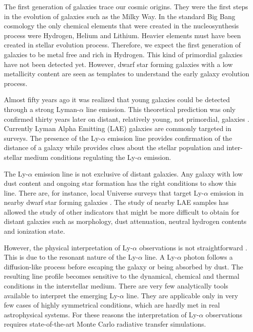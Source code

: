 \documentclass[a4paper, usenatbib, 12pt]{article}
\begin{document}
{The first generation of galaxies trace our cosmic origins. 
They were the first steps in the evolution of galaxies such as the Milky
Way. 
In the standard Big Bang cosmology the only chemical elements that
were created in the nucleosynthesis process were Hydrogen, Helium and
Lithium.  
Heavier elements must have been created in stellar evolution process. 
Therefore, we expect the first generation of
galaxies to be metal free and rich in Hydrogen. 
This kind of primordial galaxies have not been detected yet. 
However, dwarf star forming galaxies with a low metallicity content
are seen as templates to understand the early galaxy evolution process. 

Almost fifty years ago \cite{PartridgePeebles} it was realized that
young galaxies could be detected through a strong Lyman-$\alpha$ line
emission.  
This theoretical prediction was only confirmed thirty years later on
distant, relatively young, not primordial, galaxies \cite{1998ApJ...498L..93D}.
Currently Lyman Alpha Emitting (LAE) galaxies are commonly targeted
in surveys. 
The presence of the Ly-$\alpha$ emission line provides confirmation of
the distance of a galaxy while provides clues about the stellar
population and inter-stellar medium conditions regulating the
Ly-$\alpha$ emission. 

The Ly-$\alpha$ emission line is not exclusive of distant galaxies. 
Any galaxy with low dust content and ongoing star formation has the
right conditions to show this line.  
There are, for instance,  local Universe surveys that target
Ly-$\alpha$ emission in nearby dwarf star forming galaxies 
\cite{LARS}. 
The study of nearby LAE samples has allowed the study of other
indicators that might be more difficult to obtain for distant galaxies
such as morphology, dust attenuation, neutral hydrogen contents and
ionization state.  

However, the physical interpretation of Ly-$\alpha$ observations is
not straightforward \cite{2015ApJ...805...14R}. 
This is due to the resonant nature of the Ly-$\alpha$ line. 
A Ly-$\alpha$ photon follows a diffusion-like process before escaping
the galaxy or being absorbed by dust. 
The resulting line profile becomes sensitive to the dynamical, chemical
and thermal conditions in the interstellar medium. 
There are very few analytically tools available to interpret the
emerging Ly-$\alpha$ line.
They are applicable only in very few cases of highly symmetrical
conditions, which are hardly met in real astrophysical systems.
For these reasons the interpretation of Ly-$\alpha$ observations
requires state-of-the-art Monte Carlo radiative transfer simulations.   


}
\end{document}
